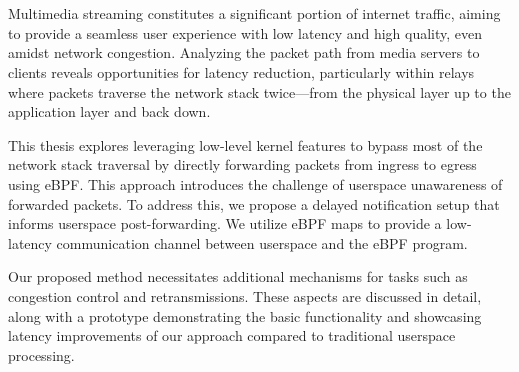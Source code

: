 \chapter{\abstractname}

Multimedia streaming constitutes a significant portion of internet traffic, 
aiming to provide a seamless user experience with low latency and high quality, 
even amidst network congestion. 
Analyzing the packet path from media servers to clients reveals opportunities 
for latency reduction, particularly within relays where packets traverse the 
network stack twice—from the physical layer up to the application layer 
and back down.

This thesis explores leveraging low-level kernel features to bypass most of the network 
stack traversal by directly forwarding packets from ingress to egress using eBPF\@. 
This approach introduces the challenge of userspace unawareness of forwarded packets. 
To address this, we propose a delayed notification setup that informs userspace post-forwarding. 
We utilize eBPF maps to provide a low-latency communication channel between userspace 
and the eBPF program.

Our proposed method necessitates additional mechanisms for tasks such as congestion 
control and retransmissions. 
These aspects are discussed in detail, along with a prototype demonstrating the 
basic functionality and showcasing latency improvements of our approach compared 
to traditional userspace processing.




